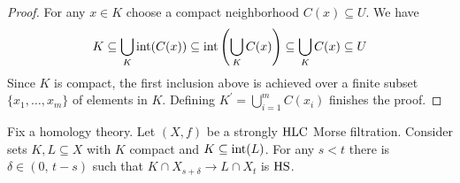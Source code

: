 \begin{proof}
	For any $x \in K$ choose a compact neighborhood $C(x) \subseteq U$.
	We have
	\begin{equation*}
	K \subseteq \bigcup_K \operatorname{int}(C(x)) \subseteq \operatorname{int}\left(\bigcup_K C(x)\right) \subseteq \bigcup_K C(x) \subseteq U
	\end{equation*}
	Since $K$ is compact, the first inclusion above is achieved over a finite subset $\{x_1, \dots, x_m\}$ of elements in $K$.
	Defining $K^\prime = \bigcup_{i=1}^m C(x_i)$ finishes the proof.
\end{proof}

\begin{lem} \label{l:key lemma for q-tameness}
	Fix a homology theory. Let $(X,f)$ be a strongly $\mathrm{HLC}$ Morse filtration.
	Consider sets $K, L \subseteq X$ with $K$ compact and $K \subseteq \operatorname{int}(L)$. For any $s < t$ there is $\delta \in (0,\, t-s)$ such that $K \cap X_{s+\delta} \to L \cap X_{t}$ is $\mathrm{HS}$.
\end{lem}

